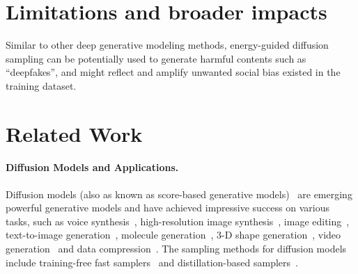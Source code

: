 \section{Limitations and broader impacts}
Similar to other deep generative modeling methods, energy-guided diffusion sampling can be potentially used to generate harmful contents such as ``deepfakes'', and might reflect and amplify unwanted social bias existed in the training dataset.


\section{Related Work}
\label{appendix:related}

\paragraph{Diffusion Models and Applications.}
Diffusion models (also as known as score-based generative models)~\citep{sohl2015deep,ho2020denoising,song2020score,karras2022elucidating} are emerging powerful generative models and have achieved impressive success on various tasks, such as voice synthesis~\citep{liu2022diffsinger,chen2020wavegrad,chen2021wavegrad}, high-resolution image synthesis~\citep{diffusion_beat_gan,ho2022cascaded}, image editing~\citep{meng2021sdedit,saharia2022palette,zhao2022egsde}, text-to-image generation~\citep{saharia2022photorealistic,nichol2021glide,ramesh2022hierarchical,rombach2022high,gu2022vector}, molecule generation~\citep{xu2022geodiff,hoogeboom2022equivariant,wu2022diffusion}, 3-D shape generation~\citep{zeng2022lion,poole2022dreamfusion,wang2022rodin}, video generation~\citep{ho2022video,ho2022imagen,yang2022diffusion,zhou2022magicvideo} and data compression~\citep{theis2022lossy, kingma2021variational,lu2022maximum}. The sampling methods for diffusion models include training-free fast samplers~\citep{song2020denoising,bao2022analytic,lu2022dpm,lu2022dpm++,zhang2022fast,zhang2022gddim} and distillation-based samplers~\citep{salimans2022progressive,meng2022distillation}.


